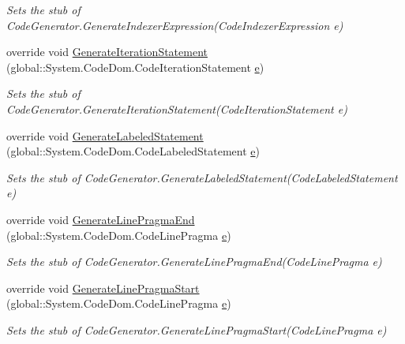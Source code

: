 \begin{DoxyCompactItemize}
\begin{DoxyCompactList}\small\item\em Sets the stub of Code\-Generator.\-Generate\-Indexer\-Expression(\-Code\-Indexer\-Expression e)\end{DoxyCompactList}\item 
override void \hyperlink{class_system_1_1_code_dom_1_1_compiler_1_1_fakes_1_1_stub_code_generator_a933724631d35d2887e7a1e9c7411cf9c}{Generate\-Iteration\-Statement} (global\-::\-System.\-Code\-Dom.\-Code\-Iteration\-Statement \hyperlink{jquery-1_810_82_8min_8js_a2c038346d47955cbe2cb91e338edd7e1}{e})
\begin{DoxyCompactList}\small\item\em Sets the stub of Code\-Generator.\-Generate\-Iteration\-Statement(\-Code\-Iteration\-Statement e)\end{DoxyCompactList}\item 
override void \hyperlink{class_system_1_1_code_dom_1_1_compiler_1_1_fakes_1_1_stub_code_generator_ad305113ca3c8e5dc2e94b6d5f32b35a2}{Generate\-Labeled\-Statement} (global\-::\-System.\-Code\-Dom.\-Code\-Labeled\-Statement \hyperlink{jquery-1_810_82_8min_8js_a2c038346d47955cbe2cb91e338edd7e1}{e})
\begin{DoxyCompactList}\small\item\em Sets the stub of Code\-Generator.\-Generate\-Labeled\-Statement(\-Code\-Labeled\-Statement e)\end{DoxyCompactList}\item 
override void \hyperlink{class_system_1_1_code_dom_1_1_compiler_1_1_fakes_1_1_stub_code_generator_a531664ce580c48a1ab1583e40466f20c}{Generate\-Line\-Pragma\-End} (global\-::\-System.\-Code\-Dom.\-Code\-Line\-Pragma \hyperlink{jquery-1_810_82_8min_8js_a2c038346d47955cbe2cb91e338edd7e1}{e})
\begin{DoxyCompactList}\small\item\em Sets the stub of Code\-Generator.\-Generate\-Line\-Pragma\-End(\-Code\-Line\-Pragma e)\end{DoxyCompactList}\item 
override void \hyperlink{class_system_1_1_code_dom_1_1_compiler_1_1_fakes_1_1_stub_code_generator_a71d1dc4af2dce3ce35eaea3930d1c3fe}{Generate\-Line\-Pragma\-Start} (global\-::\-System.\-Code\-Dom.\-Code\-Line\-Pragma \hyperlink{jquery-1_810_82_8min_8js_a2c038346d47955cbe2cb91e338edd7e1}{e})
\begin{DoxyCompactList}\small\item\em Sets the stub of Code\-Generator.\-Generate\-Line\-Pragma\-Start(\-Code\-Line\-Pragma e)\end{DoxyCompactList}\item 

\end{DoxyCompactItemize}
